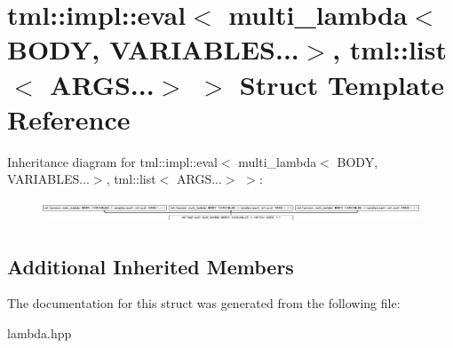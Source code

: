 \hypertarget{structtml_1_1impl_1_1eval_3_01multi__lambda_3_01BODY_00_01VARIABLES_8_8_8_4_00_01tml_1_1list_3_01ARGS_8_8_8_4_01_4}{\section{tml\+:\+:impl\+:\+:eval$<$ multi\+\_\+lambda$<$ B\+O\+D\+Y, V\+A\+R\+I\+A\+B\+L\+E\+S...$>$, tml\+:\+:list$<$ A\+R\+G\+S...$>$ $>$ Struct Template Reference}
\label{structtml_1_1impl_1_1eval_3_01multi__lambda_3_01BODY_00_01VARIABLES_8_8_8_4_00_01tml_1_1list_3_01ARGS_8_8_8_4_01_4}
}
Inheritance diagram for tml\+:\+:impl\+:\+:eval$<$ multi\+\_\+lambda$<$ B\+O\+D\+Y, V\+A\+R\+I\+A\+B\+L\+E\+S...$>$, tml\+:\+:list$<$ A\+R\+G\+S...$>$ $>$\+:\begin{figure}[H]
\begin{center}
\leavevmode
\includegraphics[height=0.680024cm]{structtml_1_1impl_1_1eval_3_01multi__lambda_3_01BODY_00_01VARIABLES_8_8_8_4_00_01tml_1_1list_3_01ARGS_8_8_8_4_01_4}
\end{center}
\end{figure}
\subsection*{Additional Inherited Members}


The documentation for this struct was generated from the following file\+:\begin{DoxyCompactItemize}
\item 
lambda.\+hpp\end{DoxyCompactItemize}
